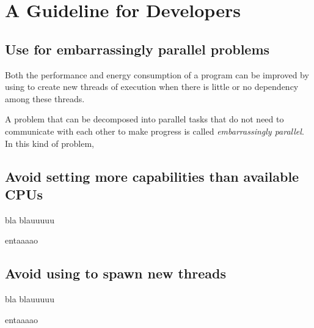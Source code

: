 \chapter{A Guideline for Developers}
\lipsum[1-2]


\section{Use \forkOn for embarrassingly parallel problems}
 Both the performance and energy consumption of a program can be improved by using \forkOn to create new threads of execution when there is little or no dependency among these threads.
\newline

 A problem that can be decomposed into parallel tasks that do not need to communicate with each other to make progress is called \emph{embarrassingly parallel}. In this kind of problem,


\section{Avoid setting more capabilities than available CPUs}
 bla blauuuuu
\newline

 entaaaao


\section{Avoid using \forkOS to spawn new threads}
 bla blauuuuu
\newline

 entaaaao
